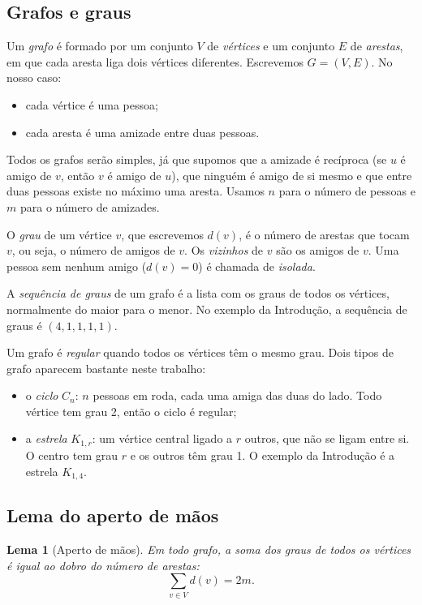 \documentclass[12pt,a4paper]{article}
\theoremstyle{plain}
\newtheorem{lema}{Lema}
\theoremstyle{definition}
\theoremstyle{remark}
\begin{document}
\subsection{Grafos e graus}

Um \emph{grafo} é formado por um conjunto $V$ de \emph{vértices} e um
conjunto $E$ de \emph{arestas}, em que cada aresta liga dois vértices
diferentes. Escrevemos $G=(V,E)$. No nosso caso:
\begin{itemize}
  \item cada vértice é uma pessoa;
  \item cada aresta é uma amizade entre duas pessoas.
\end{itemize}
Todos os grafos serão simples, já que supomos que a amizade é recíproca (se $u$ é amigo de $v$, então $v$ é amigo de $u$), que ninguém é amigo de si mesmo e que entre duas pessoas
existe no máximo uma aresta. Usamos $n$ para o número de pessoas e
$m$ para o número de amizades.

O \emph{grau} de um vértice $v$, que escrevemos $d(v)$, é o número de
arestas que tocam $v$, ou seja, o número de amigos de $v$. Os
\emph{vizinhos} de $v$ são os amigos de $v$. Uma pessoa sem nenhum amigo
($d(v)=0$) é chamada de \emph{isolada}.

A \emph{sequência de graus} de um grafo é a lista com os graus de todos
os vértices, normalmente do maior para o menor. No exemplo da
Introdução, a sequência de graus é $(4,1,1,1,1)$.

Um grafo é \emph{regular} quando todos os vértices têm o mesmo grau.
Dois tipos de grafo aparecem bastante neste trabalho:
\begin{itemize}
  \item o \emph{ciclo} $C_n$: $n$ pessoas em roda, cada uma amiga das
        duas do lado. Todo vértice tem grau 2, então o ciclo é regular;
  \item a \emph{estrela} $K_{1,r}$: um vértice central ligado a $r$
        outros, que não se ligam entre si. O centro tem grau $r$ e os
        outros têm grau 1. O exemplo da Introdução é a estrela $K_{1,4}$.
\end{itemize}

\subsection{Lema do aperto de mãos}

\begin{lema}[Aperto de mãos]\label{lema:aperto}
Em todo grafo, a soma dos graus de todos os vértices é igual ao dobro
do número de arestas:
\[
\sum_{v\in V} d(v) = 2m.
\]
\end{lema}
\end{document}
